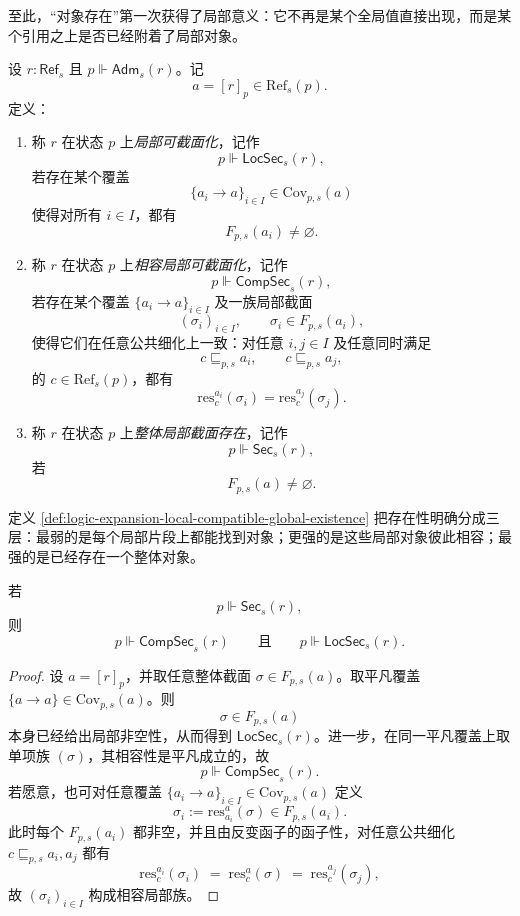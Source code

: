 至此，“对象存在”第一次获得了局部意义：它不再是某个全局值直接出现，而是某个引用之上是否已经附着了局部对象。

\begin{definition}[局部、相容与整体存在]\label{def:logic-expansion-local-compatible-global-existence}
设 \(r:\mathsf{Ref}_s\) 且 \(p\Vdash \mathsf{Adm}_s(r)\)。记
\[
a=[r]_p\in \mathrm{Ref}_s(p).
\]
定义：
\begin{enumerate}
  \item 称 \(r\) 在状态 \(p\) 上\emph{局部可截面化}，记作
  \[
  p\Vdash \mathsf{LocSec}_s(r),
  \]
  若存在某个覆盖
  \[
  \{a_i\to a\}_{i\in I}\in \mathrm{Cov}_{p,s}(a)
  \]
  使得对所有 \(i\in I\)，都有
  \[
  F_{p,s}(a_i)\neq \varnothing.
  \]
  \item 称 \(r\) 在状态 \(p\) 上\emph{相容局部可截面化}，记作
  \[
  p\Vdash \mathsf{CompSec}_s(r),
  \]
  若存在某个覆盖 \(\{a_i\to a\}_{i\in I}\) 及一族局部截面
  \[
  (\sigma_i)_{i\in I},
  \qquad
  \sigma_i\in F_{p,s}(a_i),
  \]
  使得它们在任意公共细化上一致：对任意 \(i,j\in I\) 及任意同时满足
  \[
  c\sqsubseteq_{p,s} a_i,
  \qquad
  c\sqsubseteq_{p,s} a_j,
  \]
  的 \(c\in \mathrm{Ref}_s(p)\)，都有
  \[
  \mathrm{res}^{a_i}_{c}(\sigma_i)=\mathrm{res}^{a_j}_{c}(\sigma_j).
  \]
  \item 称 \(r\) 在状态 \(p\) 上\emph{整体局部截面存在}，记作
  \[
  p\Vdash \mathsf{Sec}_s(r),
  \]
  若
  \[
  F_{p,s}(a)\neq \varnothing.
  \]
\end{enumerate}
\end{definition}

定义 \ref{def:logic-expansion-local-compatible-global-existence} 把存在性明确分成三层：最弱的是每个局部片段上都能找到对象；更强的是这些局部对象彼此相容；最强的是已经存在一个整体对象。

\begin{proposition}[整体存在蕴含局部相容存在]\label{prop:logic-expansion-global-implies-compatible-local}
若
\[
p\Vdash \mathsf{Sec}_s(r),
\]
则
\[
p\Vdash \mathsf{CompSec}_s(r)
\qquad\text{且}\qquad
p\Vdash \mathsf{LocSec}_s(r).
\]
\end{proposition}

\begin{proof}
设 \(a=[r]_p\)，并取任意整体截面 \(\sigma\in F_{p,s}(a)\)。取平凡覆盖 \(\{a\to a\}\in \mathrm{Cov}_{p,s}(a)\)。则
\[
\sigma\in F_{p,s}(a)
\]
本身已经给出局部非空性，从而得到 \(\mathsf{LocSec}_s(r)\)。进一步，在同一平凡覆盖上取单项族 \((\sigma)\)，其相容性是平凡成立的，故
\[
p\Vdash \mathsf{CompSec}_s(r).
\]
若愿意，也可对任意覆盖 \(\{a_i\to a\}_{i\in I}\in \mathrm{Cov}_{p,s}(a)\) 定义
\[
\sigma_i:=\mathrm{res}^{a}_{a_i}(\sigma)\in F_{p,s}(a_i).
\]
此时每个 \(F_{p,s}(a_i)\) 都非空，并且由反变函子的函子性，对任意公共细化 \(c\sqsubseteq_{p,s} a_i,a_j\) 都有
\[
\mathrm{res}^{a_i}_{c}(\sigma_i)
\;=\;
\mathrm{res}^{a}_{c}(\sigma)
\;=\;
\mathrm{res}^{a_j}_{c}(\sigma_j),
\]
故 \((\sigma_i)_{i\in I}\) 构成相容局部族。
\end{proof}

